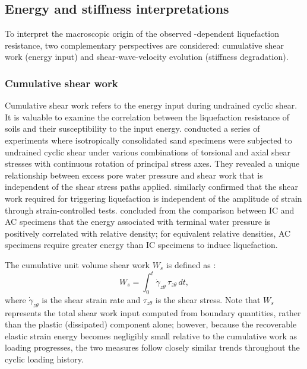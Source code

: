 \documentclass[../main]{subfiles}
\begin{document}
\subsection{Energy and stiffness interpretations}
\label{subsec:ch4_energy_stiffness}

To interpret the macroscopic origin of the observed \Kzero{}-dependent liquefaction resistance, two complementary perspectives are considered: cumulative shear work (energy input) and shear-wave-velocity evolution (stiffness degradation).

\subsubsection{Cumulative shear work}

Cumulative shear work refers to the energy input during undrained cyclic shear. It is valuable to examine the correlation between the liquefaction resistance of soils and their susceptibility to the input energy. \citet{TowhataIshihara1985} conducted a series of experiments where isotropically consolidated sand specimens were subjected to undrained cyclic shear under various combinations of torsional and axial shear stresses with continuous rotation of principal stress axes. They revealed a unique relationship between excess pore water pressure and shear work that is independent of the shear stress paths applied. \citet{Figueroa1994} similarly confirmed that the shear work required for triggering liquefaction is independent of the amplitude of strain through strain-controlled tests. \citet{GeorgiannouKonstadinou2014} concluded from the comparison between IC and AC specimens that the energy associated with terminal water pressure is positively correlated with relative density; for equivalent relative densities, AC specimens require greater energy than IC specimens to induce liquefaction.

The cumulative unit volume shear work $W_s$ is defined as \citep{TowhataIshihara1985}:
\begin{equation}
W_s = \int_0^t \dot{\gamma}_{z\theta}\,\tau_{z\theta}\,dt,
\label{eq:ch4_shear_work}
\end{equation}
where $\dot{\gamma}_{z\theta}$ is the shear strain rate and $\tau_{z\theta}$ is the shear stress. Note that $W_s$ represents the total shear work input computed from boundary quantities, rather than the plastic (dissipated) component alone; however, because the recoverable elastic strain energy becomes negligibly small relative to the cumulative work as loading progresses, the two measures follow closely similar trends throughout the cyclic loading history.
\end{document}
